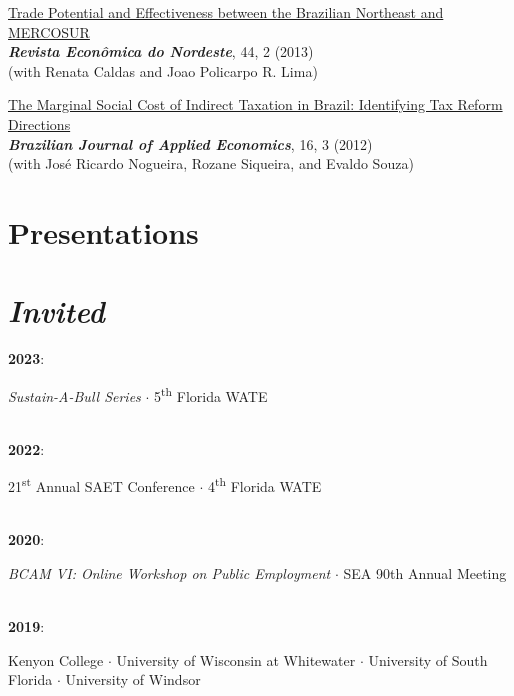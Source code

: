\documentclass[mm, 10pt]{simple_style}
\begin{document}
\begin{resume}
\href{https://www.bnb.gov.br/revista/index.php/ren/article/view/78/58}{Trade Potential and Effectiveness between the Brazilian Northeast and MERCOSUR} \\
\textbf{\textit{Revista Econ\^omica do Nordeste}}, 44, 2 (2013) \\
(with Renata Caldas and Joao Policarpo R. Lima) 

\href{https://www.scielo.br/scielo.php?pid=S1413-80502012000300001&script=sci_arttext}{The Marginal Social Cost of Indirect Taxation in Brazil: Identifying Tax Reform Directions} \\
\textbf{\textit{Brazilian Journal of Applied Economics}}, 16, 3 (2012) \\
(with Jos\'e Ricardo Nogueira, Rozane Siqueira, and Evaldo Souza)


\section{Presentations \\ {\protect\footnotesize {} \\ \emph{Invited}}}

\textbf{2023}: \begin{minipage}[t]{0.9\textwidth}
        \emph{Sustain-A-Bull Series}
        $\cdot$ 5\textsuperscript{th} Florida WATE
        \end{minipage}\\
\textbf{2022}: \begin{minipage}[t]{0.9\textwidth}
        21\textsuperscript{st} Annual SAET Conference 
        $\cdot$ 4\textsuperscript{th} Florida WATE 
        \end{minipage}\\
\textbf{2020}: \begin{minipage}[t]{0.9\textwidth}
        \emph{BCAM VI: Online Workshop on Public Employment} $\cdot$ SEA 90th Annual Meeting
        \end{minipage}\\        
\textbf{2019}: \begin{minipage}[t]{0.9\textwidth}
        Kenyon College 
        $\cdot$ University of Wisconsin at Whitewater 
        $\cdot$ University of South Florida 
        $\cdot$ University of Windsor 
        \end{minipage}\\         




\end{resume}
\end{document}
